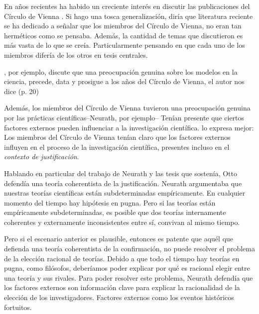 \noindent En años recientes ha habido un creciente interés en discutir las publicaciones del Círculo de Vienna \parencite{Bentley2023, Richardson2023, Suarez2024, Riel2014}.
Si hago una tosca generalización, diría que literatura reciente se ha dedicado a señalar que los miembros del Círculo de Vienna, no eran tan herméticos como se pensaba.
Además, la cantidad de temas que discutieron es más vasta de lo que se creía.
Particularmente pensando en que cada uno de los miembros difería de los otros en tesis centrales.

\textcite{Suarez2024}, por ejemplo, discute que una preocupación genuina sobre los modelos en la ciencia, precede, data y prosigue a los años del Círculo de Vienna, el autor nos dice  (p. 20)

Además, los miembros del Círculo de Vienna tuvieron una preocupación genuina por las prácticas científicas--Neurath, por ejemplo--
Tenían presente que ciertos factores externos pueden influenciar a la investigación científica.
\textcite[][p. 24]{Bentley2023} lo expresa mejor: 
Los miembros del Círculo de Vienna tenían claro que los factores externos influyen en el proceso de la investigación científica, presentes incluso en el \emph{contexto de justificación}.

Hablando en particular del trabajo de Neurath y las tesis que sostenía, Otto defendía una teoría coherentista de la justificación.
Neurath argumentaba que nuestras teorías científicas están subdeterminadas empíricamente.
En cualquier momento del tiempo hay hipótesis en pugna.
Pero si las teorías están empíricamente subdeterminadas, es posible que dos teorías internamente coherentes y externamente inconsistentes entre sí, convivan al mismo tiempo.

Pero si el escenario anterior es plausible, entonces es patente que aquél que defienda una teoría coherentista de la confirmación, no puede resolver el problema de la elección racional de teorías.
Debido a que todo el tiempo hay teorías en pugna, como filósofos, deberíamos poder explicar por qué es racional elegir entre una teoría y sus rivales. Para poder resolver este problema, Neurath defendía que los factores externos son información clave para explicar la racionalidad de la elección de los investigadores.
Factores externos como los eventos históricos fortuitos.

